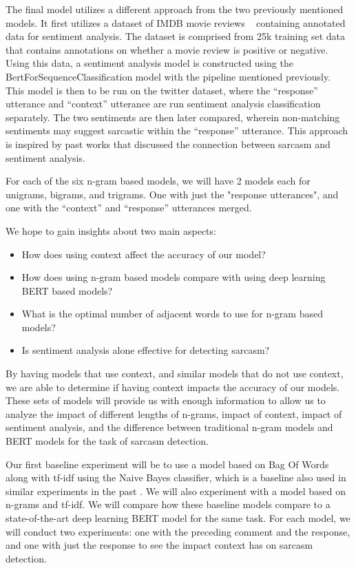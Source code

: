 \documentclass[11pt,a4paper]{article}
\begin{document}
The final model utilizes a different approach from the two previously mentioned models. It first utilizes a dataset of IMDB movie reviews ~\cite{maas-EtAl:2011:ACL-HLT2011}
containing annotated data for sentiment analysis. The dataset is comprised from 25k training set data that contains annotations on whether a movie review is positive or negative.
Using this data, a sentiment analysis model is constructed using the BertForSequenceClassification model with the pipeline mentioned previously. This model is then to be run on the
twitter dataset, where the “response” utterance and “context” utterance are run sentiment analysis classification separately. The two sentiments are then later compared, wherein
non-matching sentiments may suggest sarcastic within the “response” utterance. This approach is inspired by past works that discussed the connection between sarcasm and sentiment
analysis. ~\cite{Veale10detectingironic}

For each of the six n-gram based models, we will have 2 models each for unigrams, bigrams, and trigrams. One with just the "response utterances", and one with the ``context'' and
``response'' utterances merged. 

We hope to gain insights about two main aspects: 
\begin{itemize}
  \item How does using context affect the accuracy of our model?
  \item How does using n-gram based models compare with using deep learning BERT based models?
  \item What is the optimal number of adjacent words to use for n-gram based models?
  \item Is sentiment analysis alone effective for detecting sarcasm?
\end{itemize}

By having models that use context, and similar models that do not use context, we are able to determine if having context impacts the accuracy of our models. These sets of models will provide us with enough information to allow us to analyze the impact of different lengths of n-grams, impact of context, impact of sentiment analysis, and the difference between traditional n-gram models and BERT models for the task of sarcasm detection.

Our first baseline experiment will be to use a model based on Bag Of Words along with tf-idf \cite{Salton:86} using the Naive Bayes classifier, which is a baseline also used in similar experiments in the past \cite{hazarika}. We will also experiment with a model based on n-grams and tf-idf. We will compare how these baseline models compare to a state-of-the-art deep learning BERT model \cite{devlin-etal-2019-bert} for the same task. For each model, we will conduct two experiments: one with the preceding comment and the response, and one with just the response to see the impact context has on sarcasm detection.
\end{document}

